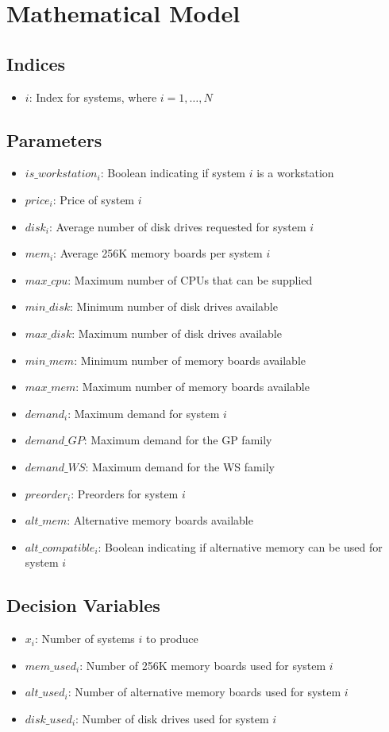 \documentclass{article}
\begin{document}
\section*{Mathematical Model}

\subsection*{Indices}
\begin{itemize}
    \item $i$: Index for systems, where $i = 1, \ldots, N$
\end{itemize}

\subsection*{Parameters}
\begin{itemize}
    \item $is\_workstation_i$: Boolean indicating if system $i$ is a workstation
    \item $price_i$: Price of system $i$
    \item $disk_i$: Average number of disk drives requested for system $i$
    \item $mem_i$: Average 256K memory boards per system $i$
    \item $max\_cpu$: Maximum number of CPUs that can be supplied
    \item $min\_disk$: Minimum number of disk drives available
    \item $max\_disk$: Maximum number of disk drives available
    \item $min\_mem$: Minimum number of memory boards available
    \item $max\_mem$: Maximum number of memory boards available
    \item $demand_i$: Maximum demand for system $i$
    \item $demand\_GP$: Maximum demand for the GP family
    \item $demand\_WS$: Maximum demand for the WS family
    \item $preorder_i$: Preorders for system $i$
    \item $alt\_mem$: Alternative memory boards available
    \item $alt\_compatible_i$: Boolean indicating if alternative memory can be used for system $i$
\end{itemize}

\subsection*{Decision Variables}
\begin{itemize}
    \item $x_i$: Number of systems $i$ to produce
    \item $mem\_used_i$: Number of 256K memory boards used for system $i$ 
    \item $alt\_used_i$: Number of alternative memory boards used for system $i$
    \item $disk\_used_i$: Number of disk drives used for system $i$
\end{itemize}
\end{document}
